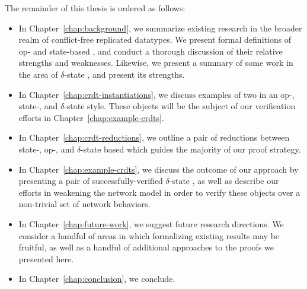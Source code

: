 The remainder of this thesis is ordered as follows:
\begin{itemize}
  \item In Chapter~\ref{chap:background}, we summarize existing research in the
    broader realm of conflict-free replicated datatypes. We present formal
    definitions of op- and state-based \CRDTs, and conduct a thorough discussion
    of their relative strengths and weaknesses. Likewise, we present a summary
    of some work in the area of $\delta$-state \CRDTs, and present its
    strengths.
  \item In Chapter~\ref{chap:crdt-instantiations}, we discuss examples of two
    \CRDTs in an op-, state-, and $\delta$-state style. These objects will be
    the subject of our verification efforts in Chapter~\ref{chap:example-crdts}.
  \item In Chapter~\ref{chap:crdt-reductions}, we outline a pair of reductions
    between state-, op-, and $\delta$-state based \CRDTs which guides the
    majority of our proof strategy.
  \item In Chapter~\ref{chap:example-crdts}, we discuss the outcome of our
    approach by presenting a pair of successfully-verified $\delta$-state
    \CRDTs, as well as describe our efforts in weakening the network model in
    order to verify these objects over a non-trivial set of network behaviors.
  \item In Chapter~\ref{chap:future-work}, we suggest future
    research directions. We consider a handful of areas in which formalizing
    existing results may be fruitful, as well as a handful of additional
    approaches to the proofs we presented here.
  \item In Chapter~\ref{chap:conclusion}, we conclude.
\end{itemize}
